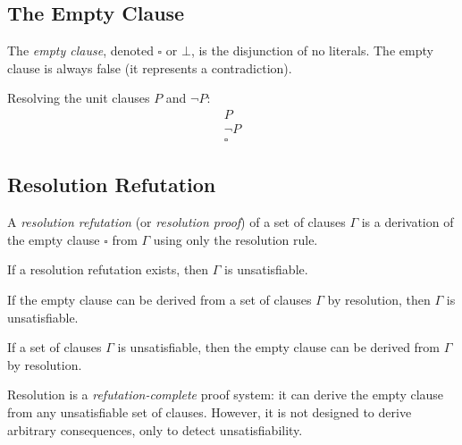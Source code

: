 \subsection{The Empty Clause}

\begin{definition}
The \emph{empty clause}, denoted $\square$ or $\bot$, is the disjunction of no
literals. The empty clause is always false (it represents a contradiction).
\end{definition}

\begin{example}
Resolving the unit clauses $P$ and $\neg P$:
\[
\begin{array}{l}
P \\
\neg P \\ \hline
\square
\end{array}
\]
\end{example}

\subsection{Resolution Refutation}

\begin{definition}
A \emph{resolution refutation} (or \emph{resolution proof}) of a set of clauses
$\Gamma$ is a derivation of the empty clause $\square$ from $\Gamma$ using only
the resolution rule.

If a resolution refutation exists, then $\Gamma$ is unsatisfiable.
\end{definition}

\begin{theorem}
If the empty clause can be derived from a set of clauses $\Gamma$ by resolution,
then $\Gamma$ is unsatisfiable.
\end{theorem}

\begin{theorem}
If a set of clauses $\Gamma$ is unsatisfiable, then the empty clause can be
derived from $\Gamma$ by resolution.
\end{theorem}

\begin{remark}
Resolution is a \emph{refutation-complete} proof system: it can derive the empty
clause from any unsatisfiable set of clauses. However, it is not designed to
derive arbitrary consequences, only to detect unsatisfiability.
\end{remark}

